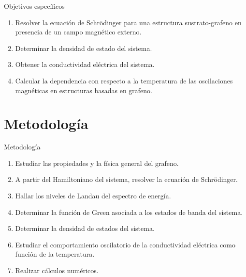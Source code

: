 		\begin{frame}{Objetivos específicos}
			\justifying
			\begin{enumerate}
			    \item Resolver la ecuación de Schrödinger para una estructura sustrato-grafeno en presencia de un campo magnético externo.
			    \item<2-> Determinar la densidad de estado del sistema.
			    \item<3-> Obtener la conductividad eléctrica del sistema.
			    \item<4-> Calcular la dependencia con respecto a la temperatura de las oscilaciones magnéticas en estructuras basadas en grafeno.
			\end{enumerate}
			
		\end{frame}

	\section{Metodología}
		\begin{frame}{Metodología}
			\justifying
			\begin{enumerate}
				\item Estudiar las propiedades y la f\'isica general del grafeno.
				\item<2-> A partir del Hamiltoniano del sistema, resolver la ecuaci\'on de Schrödinger.
				\item<3-> Hallar los niveles de Landau del espectro de energ\'ia.
				\item<4-> Determinar la funci\'on de Green asociada a los estados de banda del sistema.
				\item<5-> Determinar la densidad de estados del sistema.
				\item<6-> Estudiar el comportamiento oscilatorio de la conductividad el\'ectrica como funci\'on de la temperatura.
				\item<7-> Realizar c\'alculos num\'ericos.
			\end{enumerate}
		\end{frame}